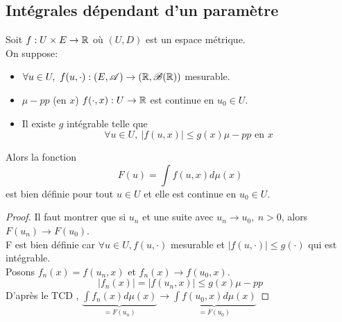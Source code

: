 \subsection{Intégrales dépendant d'un paramètre}

\begin{theorem}
	Soit $f : U \times E \to \mathbb{R}$ où $(U,D)$ est un espace métrique.\\
	On suppose:
	\begin{itemize}
		\item $\forall u \in U,\ f (u, \cdot) : (E, \mathscr{A}) \to (\mathbb{R}, \mathscr{B}(\mathbb{R}))$ mesurable.
		\item $\mu-pp$ (en $x$) $f(\cdot, x) : U  \to \mathbb{R}$ est continue en $u_0 \in U$.
		\item Il existe $g$ intégrable telle que
		      $$\forall u \in U, \ \left| f(u,x) \right| \leq g(x) \mu-pp \text{ en } x$$
	\end{itemize}
	Alors la fonction
	$$F (u) = \int f(u,x) d\mu(x)$$
	est bien définie pour tout $u \in U$ et elle est continue en $u_0 \in U$.
\end{theorem}


\begin{proof}
	Il faut montrer que si $u_n$ et une suite avec $u_n \to u_0, \ n > 0$, alors $F(u_n) \to F(u_0)$.\\
	F est bien définie car $\forall u \in U, f(u,\cdot)$ mesurable et $|f(u,\cdot)| \leq g(\cdot)$ qui est intégrable.\\

	Posons $f_n(x) = f(u_n,x)$ et $f_n(x) \to f(u_0,x)$.\\
	$$|f_n(x)|= |f(u_n, x)| \leq g(x) \mu-pp$$
	D'après le TCD , $\underbrace{\int f_n(x)d\mu(x)}_{=F(u_n)} \to  \underbrace{\int f(u_0, x)d\mu(x)}_{= F(u_0)}$
\end{proof}

